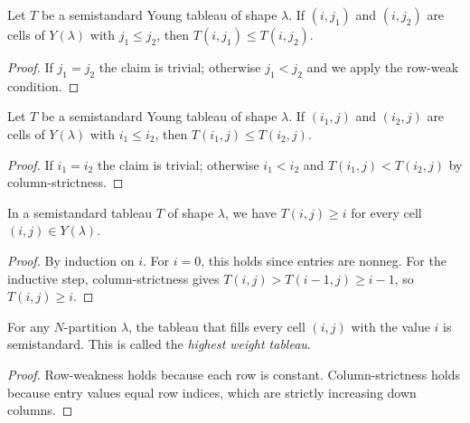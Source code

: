 \begin{lemma}
\label{lem.sf.ssyt-row-weak-of-le}
\leanhelper
\leanok
Let $T$ be a semistandard Young tableau of shape $\lambda$.
If $(i, j_1)$ and $(i, j_2)$ are cells of $Y(\lambda)$ with $j_1 \le j_2$,
then $T(i,j_1) \le T(i,j_2)$.
\end{lemma}

\begin{proof}
\leanok
If $j_1 = j_2$ the claim is trivial; otherwise $j_1 < j_2$ and we
apply the row-weak condition.
\end{proof}

\begin{lemma}
\label{lem.sf.ssyt-col-weak}
\leanhelper
\leanok
Let $T$ be a semistandard Young tableau of shape $\lambda$.
If $(i_1, j)$ and $(i_2, j)$ are cells of $Y(\lambda)$ with $i_1 \le i_2$,
then $T(i_1,j) \le T(i_2,j)$.
\end{lemma}

\begin{proof}
\leanok
If $i_1 = i_2$ the claim is trivial; otherwise $i_1 < i_2$ and
$T(i_1,j) < T(i_2,j)$ by column-strictness.
\end{proof}

\begin{lemma}
\label{lem.sf.ssyt-entry-ge-row}
\leanhelper
\leanok
In a semistandard tableau $T$ of shape $\lambda$, we have $T(i,j) \ge i$ for
every cell $(i,j) \in Y(\lambda)$.
\end{lemma}

\begin{proof}
\leanok
By induction on $i$.
For $i = 0$, this holds since entries are nonneg.
For the inductive step, column-strictness gives
$T(i, j) > T(i{-}1, j) \ge i{-}1$, so $T(i,j) \ge i$.
\end{proof}

\begin{lemma}
\label{lem.sf.ssyt-highest-weight}
\leanhelper
\leanok
For any $N$-partition $\lambda$, the tableau that fills every cell $(i,j)$ with
the value $i$ is semistandard.
This is called the \emph{highest weight tableau}.
\end{lemma}

\begin{proof}
\leanok
Row-weakness holds because each row is constant.
Column-strictness holds because entry values equal row indices, which
are strictly increasing down columns.
\end{proof}

